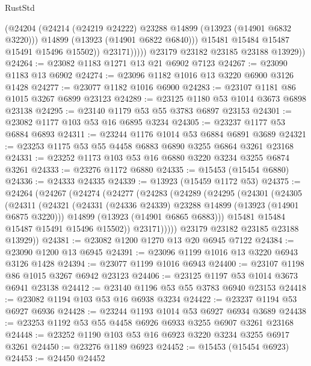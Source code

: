 \begin{lexlean}{RustStd}
\begin{coremodule}
                      (@24204
                        (@24214 (@24219 @24222) @23288 @14899 (@13923 (@14901 @6832 @3220)))
                        @14899
                        (@13923 (@14901 @6822 @6840)))
                      @15481
                      @15484
                      @15487
                      @15491
                      @15496
                      @15502))
                  @23171)))))
        @23179
        @23182
        @23185
        @23188
        @13929))
@24264 := @23082 @1183 @1271 @13 @21 @6902 @7123
@24267 := @23090 @1183 @13 @6902
@24274 := @23096 @1182 @1016 @13 @3220 @6900 @3126 @1428
@24277 := @23077 @1182 @1016 @6900
@24283 := @23107 @1181 @86 @1015 @3267 @6899 @23123
@24289 := @23125 @1180 @53 @1014 @3673 @6898 @23138
@24295 := @23140 @1179 @53 @55 @3783 @6897 @23153
@24301 := @23082 @1177 @103 @53 @16 @6895 @3234
@24305 := @23237 @1177 @53 @6884 @6893
@24311 := @23244 @1176 @1014 @53 @6884 @6891 @3689
@24321 := @23253 @1175 @53 @55 @4458 @6883 @6890 @3255 @6864 @3261 @23168
@24331 := @23252 @1173 @103 @53 @16 @6880 @3220 @3234 @3255 @6874 @3261
@24333 := @23276 @1172 @6880
@24335 := @15453 (@15454 @6880)
@24336 := @24333 @24335
@24339 := @13923 (@15459 @1172 @53)
@24375 := @24264
    (@24267
      (@24274
        (@24277
          (@24283
            (@24289
              (@24295
                (@24301
                  (@24305
                    (@24311
                      (@24321
                        (@24331 (@24336 @24339) @23288 @14899 (@13923 (@14901 @6875 @3220)))
                        @14899
                        (@13923 (@14901 @6865 @6883)))
                      @15481
                      @15484
                      @15487
                      @15491
                      @15496
                      @15502))
                  @23171)))))
        @23179
        @23182
        @23185
        @23188
        @13929))
@24381 := @23082 @1200 @1270 @13 @20 @6945 @7122
@24384 := @23090 @1200 @13 @6945
@24391 := @23096 @1199 @1016 @13 @3220 @6943 @3126 @1428
@24394 := @23077 @1199 @1016 @6943
@24400 := @23107 @1198 @86 @1015 @3267 @6942 @23123
@24406 := @23125 @1197 @53 @1014 @3673 @6941 @23138
@24412 := @23140 @1196 @53 @55 @3783 @6940 @23153
@24418 := @23082 @1194 @103 @53 @16 @6938 @3234
@24422 := @23237 @1194 @53 @6927 @6936
@24428 := @23244 @1193 @1014 @53 @6927 @6934 @3689
@24438 := @23253 @1192 @53 @55 @4458 @6926 @6933 @3255 @6907 @3261 @23168
@24448 := @23252 @1190 @103 @53 @16 @6923 @3220 @3234 @3255 @6917 @3261
@24450 := @23276 @1189 @6923
@24452 := @15453 (@15454 @6923)
@24453 := @24450 @24452

\end{coremodule}
\end{lexlean}
